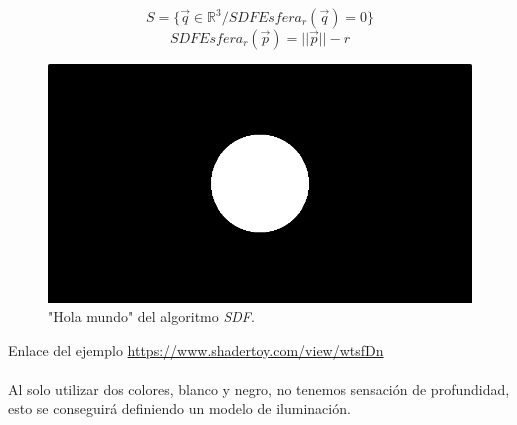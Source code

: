 \[S=\{\Vec{q} \in \mathbb{R}^3 / SDFEsfera_r(\Vec{q})=0\}\]
\[ SDFEsfera_r(\Vec{p})=\vert\vert\Vec{p}\vert\vert - r  \]
\begin{figure}[H]
  \centering
  \captionsetup{justification=centering}%
  \includegraphics[width=1.0\textwidth]{secciones/imagenes/starting/sdf1.png}
  \caption{"Hola mundo" del algoritmo \textit{SDF}.}
  \label{fig:hello}
\end{figure}

Enlace del ejemplo \url{https://www.shadertoy.com/view/wtsfDn}\\\\
Al solo utilizar dos colores, blanco y negro, no tenemos sensación de profundidad, esto se conseguirá definiendo un modelo de iluminación.